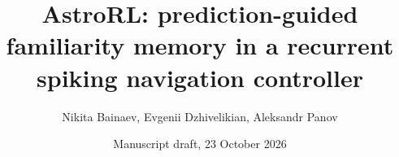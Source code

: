 \documentclass[11pt,a4paper]{article}
\title{AstroRL: prediction-guided familiarity memory in a recurrent spiking navigation controller}
\author{Nikita Bainaev, Evgenii Dzhivelikian, Aleksandr Panov}
\date{Manuscript draft, 23 October 2026}
\begin{document}
\maketitle
\begin{abstract}

\end{abstract}
\clearpage

\clearpage



\FloatBarrier

\FloatBarrier


\clearpage
\begingroup\raggedright


\endgroup
\clearpage\appendix
\setcounter{figure}{0}
\setcounter{table}{0}
\renewcommand{\thefigure}{S\arabic{figure}}
\renewcommand{\thetable}{S\arabic{table}}
\renewcommand{\theHfigure}{supplement.\arabic{figure}}
\renewcommand{\theHtable}{supplement.\arabic{table}}

\FloatBarrier

\end{document}
